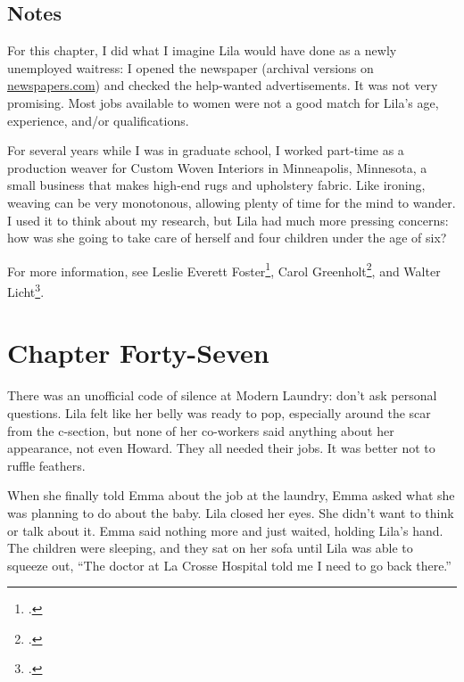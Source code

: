 \documentclass[
  letterpaper,
]{book}
\begin{document}
\section{Notes}\label{notes-48}

For this chapter, I did what I imagine Lila would have done as a newly
unemployed waitress: I opened the newspaper (archival versions on
\href{https://www.newspapers.com/}{newspapers.com}) and checked the
help-wanted advertisements. It was not very promising. Most jobs
available to women were not a good match for Lila's age, experience,
and/or qualifications.

For several years while I was in graduate school, I worked part-time as
a production weaver for Custom Woven Interiors in Minneapolis,
Minnesota, a small business that makes high-end rugs and upholstery
fabric. Like ironing, weaving can be very monotonous, allowing plenty of
time for the mind to wander. I used it to think about my research, but
Lila had much more pressing concerns: how was she going to take care of
herself and four children under the age of six?

For more information, see Leslie Everett Foster\footnote{.}, Carol
Greenholt\footnote{.}, and Walter
Licht\footnote{.}.


\chapter{Chapter Forty-Seven}\label{chapter-forty-seven}

There was an unofficial code of silence at Modern Laundry: don't ask
personal questions. Lila felt like her belly was ready to pop,
especially around the scar from the c-section, but none of her
co-workers said anything about her appearance, not even Howard. They all
needed their jobs. It was better not to ruffle feathers.

When she finally told Emma about the job at the laundry, Emma asked what
she was planning to do about the baby. Lila closed her eyes. She didn't
want to think or talk about it. Emma said nothing more and just waited,
holding Lila's hand. The children were sleeping, and they sat on her
sofa until Lila was able to squeeze out, ``The doctor at La Crosse
Hospital told me I need to go back there.''
\end{document}
